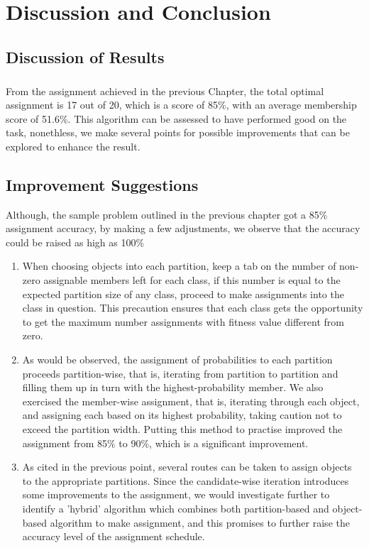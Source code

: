 \documentclass[a4paper,openany]{book}
\begin{document}
	\chapter{Discussion and Conclusion}
		\section{Discussion of Results}
			\paragraph{}
				From the assignment achieved in the previous Chapter, the total optimal assignment is 17 out of 20, which is a score of 85\%, with an average membership score of 51.6\%. This algorithm can be assessed to have performed good on the task, nonethless, we make several points for possible improvements that can be explored to enhance the result.
		\section{Improvement Suggestions}
			Although, the sample problem outlined in the previous chapter got a 85\% assignment accuracy, by making a few adjustments, we observe that the accuracy could be raised as high as 100\%
			\begin{enumerate}
				\item When choosing objects into each partition, keep a tab on the number of non-zero assignable members left for each class, if this number is equal to the expected partition size of any class, proceed to make assignments into the class in question. This precaution ensures that each class gets the opportunity to get the maximum number assignments with fitness value different from zero.
				\item As would be observed, the assignment of probabilities to each partition proceeds partition-wise, that is, iterating from partition to partition and filling them up in turn with the highest-probability member. We also exercised the member-wise assignment, that is, iterating through each object, and assigning each based on its highest probability, taking caution not to exceed the partition width. Putting this method to practise improved the assignment from 85\% to 90\%, which is a significant improvement.
				\item As cited in the previous point, several routes can be taken to assign objects to the appropriate partitions. Since the candidate-wise iteration introduces some improvements to the assignment, we would investigate further to identify a 'hybrid' algorithm which combines both partition-based and object-based algorithm to make assignment, and this promises to further raise the accuracy level of the assignment schedule.
			\end{enumerate}
\end{document}
